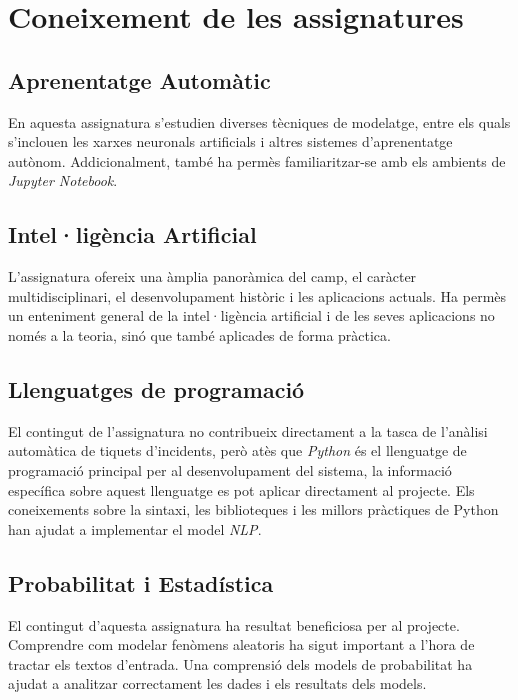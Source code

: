 \section{Coneixement de les assignatures}
\subsection*{Aprenentatge Automàtic}
En aquesta assignatura s'estudien diverses tècniques de modelatge, entre els quals s'inclouen les xarxes neuronals artificials i altres sistemes d'aprenentatge autònom. Addicionalment, també ha permès familiaritzar-se amb els ambients de \textit{Jupyter Notebook}.

\subsection*{Intel·ligència Artificial}
L'assignatura ofereix una àmplia panoràmica del camp, el caràcter multidisciplinari, el desenvolupament històric i les aplicacions actuals. Ha permès un enteniment general de la intel·ligència artificial i de les seves aplicacions no només a la teoria, sinó que també aplicades de forma pràctica.

\subsection*{Llenguatges de programació}
El contingut de l'assignatura no contribueix directament a la tasca de l'anàlisi automàtica de tiquets d'incidents, però atès que \textit{Python} és el llenguatge de programació principal per al desenvolupament del sistema, la informació específica sobre aquest llenguatge es pot aplicar directament al projecte. Els coneixements sobre la sintaxi, les biblioteques i les millors pràctiques de Python han ajudat a implementar el model \textit{NLP}.

\subsection*{Probabilitat i Estadística}
El contingut d'aquesta assignatura ha resultat beneficiosa per al projecte. Comprendre com modelar fenòmens aleatoris ha sigut important a l'hora de tractar els textos d'entrada. Una comprensió dels models de probabilitat ha ajudat a analitzar correctament les dades i els resultats dels models.
